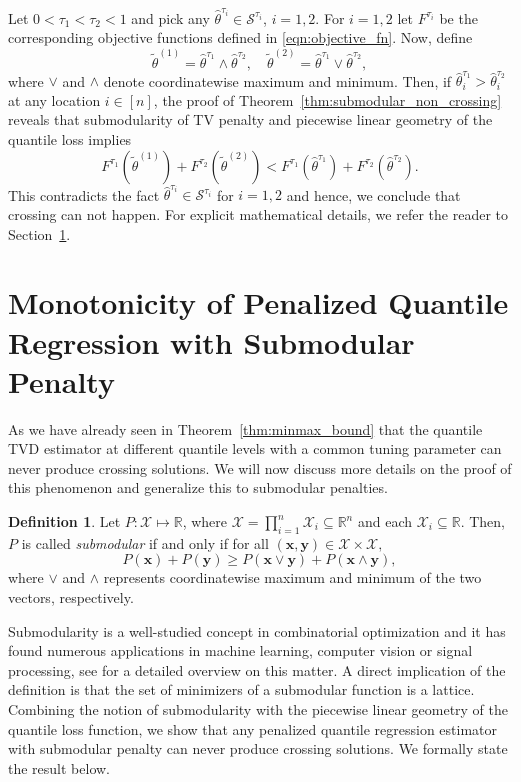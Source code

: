 \documentclass[11pt]{article}
\newcommand{\cS}{\mathcal{S}}
\newcommand{\bR}{\mathbb{R}}
\theoremstyle{plain}
\theoremstyle{definition}
\newtheorem{definition}[theorem]{Definition}
\theoremstyle{remark}
\begin{document}
Let $0<\tau_1<\tau_2<1$ and pick any $\hat{\theta}^{\tau_i}\in \cS^{\tau_i}$, $i=1,2$. For $i=1,2$ let $F^{\tau_i}$ be the corresponding objective functions defined in \eqref{eqn:objective_fn}. Now, define
\[
\tilde{\theta}^{(1)} = \hat{\theta}^{\tau_1} \wedge \hat{\theta}^{\tau_2},\quad\tilde{\theta}^{(2)} = \hat{\theta}^{\tau_1} \vee \hat{\theta}^{\tau_2},
\]
where $\vee$ and $\wedge$ denote coordinatewise maximum and minimum. Then, if $\hat{\theta}^{\tau_1}_i>\hat{\theta}^{\tau_2}_i$ at any location $i\in [n]$, the proof of Theorem~\ref{thm:submodular_non_crossing} reveals that submodularity of TV penalty and piecewise linear geometry of the quantile loss implies
\[F^{\tau_1}(\tilde{\theta}^{(1)})+F^{\tau_2}(\tilde{\theta}^{(2)})<F^{\tau_1}(\hat{\theta}^{\tau_1})+F^{\tau_2}(\hat{\theta}^{\tau_2}).\]
This contradicts the fact $\hat{\theta}^{\tau_i}\in \cS^{\tau_i}$ for $i=1,2$ and hence, we conclude that crossing can not happen. For explicit mathematical details, we refer the reader to Section~\ref{sec:monotonicity}.


\section{Monotonicity of Penalized Quantile Regression with Submodular Penalty}\label{sec:monotonicity}  
As we have already seen in Theorem~\ref{thm:minmax_bound} that the quantile TVD estimator at different quantile levels with a common tuning parameter can never produce crossing solutions. We will now discuss more details on the proof of this phenomenon and generalize this to submodular penalties.
\begin{definition}
    Let $P:\mathcal{X}\mapsto \bR$, where $\mathcal X=\prod_{i=1}^n \mathcal X_i\subseteq \bR^n$ and each $\mathcal X_i\subseteq \bR$. Then, $P$ is called \textit{submodular} if and only if for all $(\mathbf{x},\mathbf{y})\in \mathcal X \times \mathcal X,$
    \[P(\mathbf{x})+P(\mathbf{y})\geq P\left(\mathbf{x}\vee \mathbf{y}\right)+P\left(\mathbf{x} \wedge \mathbf{y}\right),\]
    where $\vee$ and $\wedge$ represents coordinatewise maximum and minimum of the two vectors, respectively.
\end{definition}
 
 Submodularity is a well-studied concept in combinatorial optimization and it has found numerous applications in machine learning, computer vision or signal
processing, see \cite{Bach2011LearningWS, bach2019submodular} for a detailed overview on this matter. A direct implication of the definition is that the set of minimizers of a submodular function is a lattice. Combining the notion of submodularity with the piecewise linear geometry of the quantile loss function, we show that any penalized quantile regression estimator with submodular penalty can never produce crossing solutions. We formally state the result below.
\end{document}
